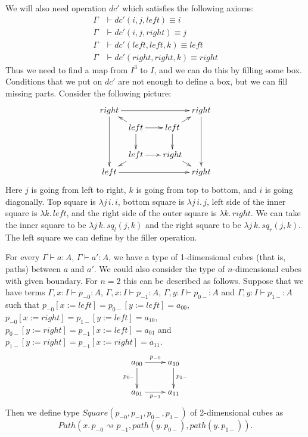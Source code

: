 \documentclass[reqno]{amsart}
\theoremstyle{definition}
\theoremstyle{remark}
\newcommand{\deq}{\equiv}
\newcommand{\repl}{:=}
\newcommand{\idtype}{\rightsquigarrow}
\numberwithin{figure}{section}
\begin{document}
We will also need operation $dc'$ which satisfies the following axioms:
\begin{align*}
\Gamma & \vdash dc'(i,j,left) \deq i \\
\Gamma & \vdash dc'(i,j,right) \deq j \\
\Gamma & \vdash dc'(left,left,k) \deq left \\
\Gamma & \vdash dc'(right,right,k) \deq right
\end{align*}
Thus we need to find a map from $I^3$ to $I$, and we can do this by filling some box.
Conditions that we put on $dc'$ are not enough to define a box, but we can fill missing parts.
Consider the following picture:
\[ \xymatrix @C=0.5pc @R=0.5pc
    { right \ar[rrrr] \ar[dddd] &         & &                      & right \ar[dddd] \\
           & left \ar[rr] \ar[dd] \ar[ul] & & left \ar[dd] \ar[ur] & \\
           &                              & &                      & \\
           & left \ar[rr] \ar[dl]         & & right \ar[dr]        & \\
      left \ar[rrrr]           &          & &                      & right
    }\]
Here $j$ is going from left to right, $k$ is going from top to bottom, and $i$ is going diagonally.
Top square is $\lambda j\,i.\,i$, bottom square is $\lambda j\,i.\,j$, left side of the inner square is $\lambda k.\,left$,
and the right side of the outer square is $\lambda k.\,right$.
We can take the inner square to be $\lambda j\,k.\,sq_l(j,k)$ and the right square to be $\lambda j\,k.\,sq_r(j,k)$.
The left square we can define by the filler operation.

For every $\Gamma \vdash a : A$, $\Gamma \vdash a' : A$, we have a type of 1-dimensional cubes (that is, paths) between $a$ and $a'$.
We could also consider the type of $n$-dimensional cubes with given boundary.
For $n = 2$ this can be described as follows.
Suppose that we have terms $\Gamma, x : I \vdash p_{-0} : A$, $\Gamma, x : I \vdash p_{-1} : A$, $\Gamma, y : I \vdash p_{0-} : A$ and $\Gamma, y : I \vdash p_{1-} : A$
such that $p_{-0}[x \repl left] = p_{0-}[y \repl left] = a_{00}$, $p_{-0}[x \repl right] = p_{1-}[y \repl left] = a_{10}$,
$p_{0-}[y \repl right] = p_{-1}[x \repl left] = a_{01}$ and $p_{1-}[y \repl right] = p_{-1}[x \repl right] = a_{11}$.
\[ \xymatrix{ a_{00} \ar[r]^{p_{-0}} \ar[d]_{p_{0-}} & a_{10} \ar[d]^{p_{1-}} \\
              a_{01} \ar[r]_{p_{-1}}                 & a_{11}
            } \]
Then we define type $Square(p_{-0},p_{-1},p_{0-},p_{1-})$ of 2-dimensional cubes as
\[ Path(x.\,p_{-0} \idtype p_{-1}, path(y.\,p_{0-}), path(y.\,p_{1-})). \]
\end{document}
